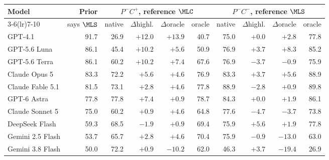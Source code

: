\begin{tabularx}{\linewidth}{@{}Xr rrrr rrrr@{}}
\toprule
Model & Prior & \multicolumn{4}{c}{$P^{-}C^{+}$, reference $\MLC$} & \multicolumn{4}{c}{$P^{-}C^{-}$, reference $\MLS$}\\
\cmidrule(lr){3-6}\cmidrule(lr){7-10}
 & says $\MLS$ & native & $\Delta$highl. & $\Delta$oracle & oracle & native & $\Delta$highl. & $\Delta$oracle & oracle\\
\midrule
GPT-4.1 & 91.7 & 26.9 & $\mathbf{+12.0}$ & $\mathbf{+13.9}$ & 40.7 & 75.0 & $+0.0$ & $+2.8$ & 77.8\\
GPT-5.6 Luna & 86.1 & 45.4 & $\mathbf{+10.2}$ & $+5.6$ & 50.9 & 76.9 & $+3.7$ & $\mathbf{+8.3}$ & 85.2\\
GPT-5.6 Terra & 86.1 & 60.2 & $\mathbf{+10.2}$ & $\mathbf{+7.4}$ & 67.6 & 76.9 & $-3.7$ & $-0.9$ & 75.9\\
Claude Opus 5 & 83.3 & 72.2 & $\mathbf{+5.6}$ & $+4.6$ & 76.9 & 83.3 & $+3.7$ & $\mathbf{+5.6}$ & 88.9\\
Claude Fable 5.1 & 81.5 & 73.1 & $+2.8$ & $+4.6$ & 77.8 & 88.9 & $-2.8$ & $+0.9$ & 89.8\\
GPT-6 Astra & 77.8 & 77.8 & $\mathbf{+7.4}$ & $+0.9$ & 78.7 & 84.3 & $+0.0$ & $+1.9$ & 86.1\\
Claude Sonnet 5 & 75.0 & 60.2 & $+0.9$ & $+4.6$ & 64.8 & 77.6 & $-4.7$ & $-3.7$ & 73.8\\
DeepSeek Flash & 59.3 & 68.5 & $-1.9$ & $+0.9$ & 69.4 & 75.9 & $+5.6$ & $+1.9$ & 77.8\\
Gemini 2.5 Flash & 53.7 & 65.7 & $+2.8$ & $+4.6$ & 70.4 & 75.9 & $-0.9$ & $\mathbf{-13.0}$ & 63.0\\
Gemini 3.8 Flash & 50.0 & 72.2 & $+0.9$ & $\mathbf{-10.2}$ & 62.0 & 46.3 & $+3.7$ & $\mathbf{-19.4}$ & 26.9\\
\bottomrule
\end{tabularx}
